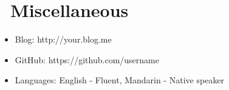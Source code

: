 \documentclass{resume}
\begin{document}



\section{\faInfo\ Miscellaneous}
\begin{itemize}[parsep=0.5ex]
  \item Blog: http://your.blog.me
  \item GitHub: https://github.com/username
  \item Languages: English - Fluent, Mandarin - Native speaker
\end{itemize}

%
%
\end{document}
